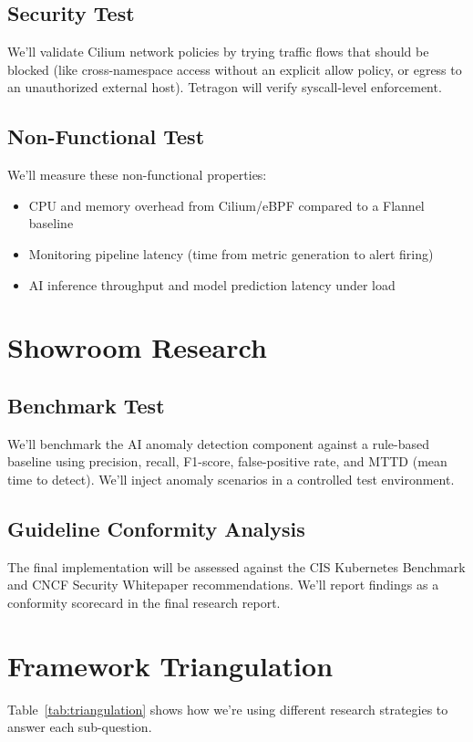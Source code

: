 \subsection{Security Test}
We'll validate Cilium network policies by trying traffic flows that should be blocked (like cross-namespace access without an explicit allow policy, or egress to an unauthorized external host). Tetragon will verify syscall-level enforcement.

\subsection{Non-Functional Test}
We'll measure these non-functional properties:
\begin{itemize}
    \item CPU and memory overhead from Cilium/eBPF compared to a Flannel baseline
    \item Monitoring pipeline latency (time from metric generation to alert firing)
    \item AI inference throughput and model prediction latency under load
\end{itemize}

\section{Showroom Research}

\subsection{Benchmark Test}
We'll benchmark the AI anomaly detection component against a rule-based baseline using precision, recall, F1-score, false-positive rate, and MTTD (mean time to detect). We'll inject anomaly scenarios in a controlled test environment.

\subsection{Guideline Conformity Analysis}
The final implementation will be assessed against the CIS Kubernetes Benchmark and CNCF Security Whitepaper recommendations. We'll report findings as a conformity scorecard in the final research report.

\section{Framework Triangulation}

Table~\ref{tab:triangulation} shows how we're using different research strategies to answer each sub-question.

